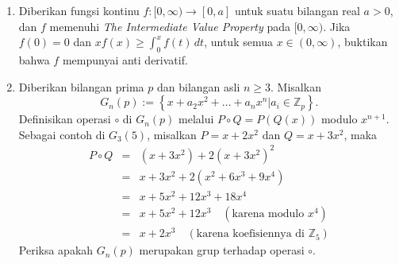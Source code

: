 \documentclass[12pt,twoside]{article}
\begin{document}
\begin{enumerate}
    \item Diberikan fungsi kontinu $f : [0,\infty) \to [0,a]$ untuk suatu bilangan real $a>0$, dan $f$ memenuhi \textit{The Intermediate Value Property} pada $[0,\infty)$. Jika $f(0)=0$ dan $xf(x)\geq\displaystyle\int_{0}^{x}f(t)\,dt$, untuk semua $x\in (0,\infty)$, buktikan bahwa $f$ mempunyai anti derivatif.


    \item Diberikan bilangan prima $p$ dan bilangan asli $n \geq 3$. Misalkan
          \begin{equation*}
              G_n(p) := \left\lbrace x+a_2x^2+\dots+a_nx^n |a_i \in \mathbb{Z}_p \right\rbrace.
          \end{equation*}
          Definisikan operasi $\circ$ di $G_n(p)$ melalui $P \circ Q = P(Q(x))$ modulo $x^{n+1}$. Sebagai contoh di $G_3(5)$, misalkan $P = x+2x^2$ dan $Q = x+3x^2$, maka
          \begin{equation*}
              \begin{array}{rcl}
                  P \circ Q & = & (x+3x^2)+2(x+3x^2)^2                                       \\
                            & = & x+3x^2+2(x^2+6x^3+9x^4)                                    \\
                            & = & x+5x^2+12x^3+18x^4                                         \\
                            & = & x+5x^2+12x^3 \quad (\text{karena modulo } x^4)             \\
                            & = & x+2x^3 \quad (\text{karena koefisiennya di } \mathbb{Z}_5)
              \end{array}
          \end{equation*}
          Periksa apakah $G_n(p)$ merupakan grup terhadap operasi $\circ$.
\end{enumerate}
\pagebreak
\end{document}
